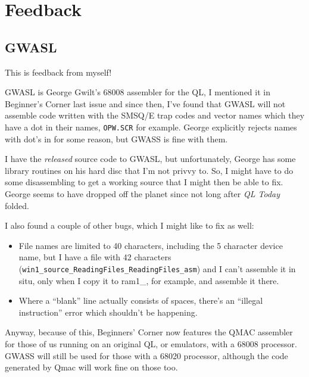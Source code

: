 
\chapter{Feedback}

\section{GWASL }

This is feedback from myself!

GWASL is George Gwilt's 68008 assembler for the QL, I mentioned it
in Beginner's Corner last issue and since then, I've found that GWASL
will not assemble code written with the SMSQ/E trap codes and vector
names which they have a dot in their names, \texttt{OPW.SCR} for example.
George explicitly rejects names with dot's in for some reason, but
GWASS is fine with them.

I have the \emph{released} source code to GWASL, but unfortunately,
George has some library routines on his hard disc that I'm not privvy
to. So, I might have to do some disassembling to get a working source
that I might then be able to fix. George seems to have dropped off
the planet since not long after \emph{QL Today} folded.

I also found a couple of other bugs, which I might like to fix as
well:
\begin{itemize}
\item File names are limited to 40 characters, including the 5 character
device name, but I have a file with 42 characters (\texttt{win1\_source\_ReadingFiles\_ReadingFiles\_asm})
and I can't assemble it in situ, only when I copy it to ram1\_, for
example, and assemble it there.
\item Where a ``blank'' line actually consists of spaces, there's an ``illegal
instruction'' error which shouldn't be happening.
\end{itemize}
Anyway, because of this, Beginners' Corner now features the QMAC assembler
for those of us running on an original QL, or emulators, with a 68008
processor. GWASS will still be used for those with a 68020 processor,
although the code generated by Qmac will work fine on those too.
